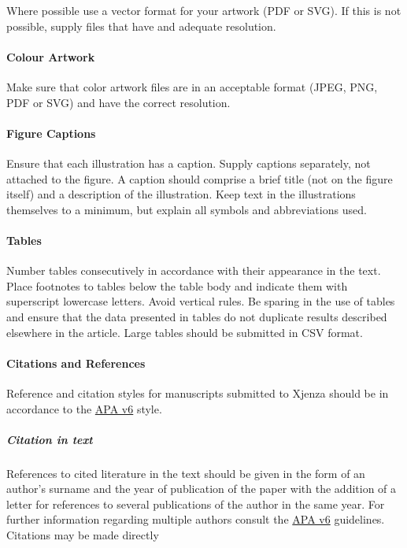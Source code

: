 Where possible use a vector format for your artwork (PDF or SVG). If this is not possible, supply files that have and adequate resolution.

\paragraph{Colour Artwork}

Make sure that color artwork files are in an acceptable format (JPEG, PNG, PDF or SVG) and have the correct resolution.

\paragraph{Figure Captions}

Ensure that each illustration has a caption. Supply captions separately, not attached to the figure. A caption should comprise a brief title (not on the figure itself) and a description of the illustration. Keep text in the illustrations themselves to a minimum, but explain all symbols and abbreviations used.

\paragraph{Tables}

Number tables consecutively in accordance with their appearance in the text. Place footnotes to tables below the table body and indicate them with superscript lowercase letters. Avoid vertical rules. Be sparing in the use of tables and ensure that the data presented in tables do not duplicate results described elsewhere in the article. Large tables should be submitted in CSV format.

\paragraph{Citations and References}

Reference and citation styles for manuscripts submitted to Xjenza should be in accordance to the \href{http://www.apastyle.org/}{APA v6} style.


\subparagraph{Citation in text}

References to cited literature in the text should be given in the form of an author's surname and the year of publication of the paper with the addition of a letter for references to several publications of the author in the same year. For further information regarding multiple authors consult the \href{http://www.apastyle.org/}{APA v6} guidelines. Citations may be made directly


